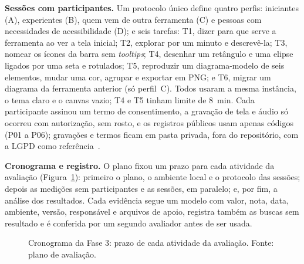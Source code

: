 \documentclass[conference]{IEEEtran}
\begin{document}
\textbf{Sessões com participantes.} Um protocolo único define quatro
perfis: iniciantes (A), experientes (B), quem vem de outra ferramenta (C) e
pessoas com necessidades de acessibilidade (D); e seis tarefas: T1, dizer
para que serve a ferramenta ao ver a tela inicial; T2, explorar por um minuto
e descrevê-la; T3, nomear os ícones da barra sem \textit{tooltips}; T4,
desenhar um retângulo e uma elipse ligados por uma seta e rotulados; T5,
reproduzir um diagrama-modelo de seis elementos, mudar uma cor, agrupar e
exportar em PNG; e T6, migrar um diagrama da ferramenta anterior (só
perfil~C). Todos usaram a mesma instância, o tema claro e o canvas vazio;
T4 e T5 tinham limite de 8~min. Cada participante assinou um termo de
consentimento, a gravação de tela e áudio só ocorreu com autorização, sem
rosto, e os registros públicos usam apenas códigos (P01 a P06); gravações e
termos ficam em pasta privada, fora do repositório, com a LGPD como
referência~\cite{lgpd}.

\textbf{Cronograma e registro.} O plano fixou um prazo para cada atividade
da avaliação (Figura~\ref{fig:cronograma}): primeiro o plano, o ambiente
local e o protocolo das sessões; depois as medições sem participantes e as
sessões, em paralelo; e, por fim, a análise dos resultados. Cada evidência
segue um modelo com valor, nota, data, ambiente, versão, responsável e
arquivos de apoio, registra também as buscas sem resultado e é conferida por
um segundo avaliador antes de ser usada.

\begin{figure}[!t]
\centering
{}
\caption{Cronograma da Fase 3: prazo de cada atividade da avaliação. Fonte: plano de avaliação.}
\label{fig:cronograma}
\end{figure}
\end{document}
